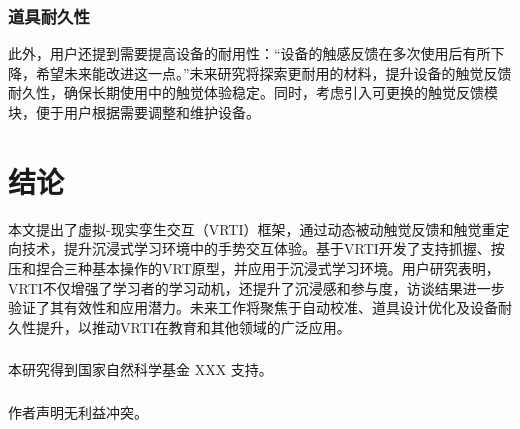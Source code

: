 \documentclass[runningheads]{llncs}
\begin{document}
\subsubsection{道具耐久性}
此外，用户还提到需要提高设备的耐用性：“设备的触感反馈在多次使用后有所下降，希望未来能改进这一点。”未来研究将探索更耐用的材料，提升设备的触觉反馈耐久性，确保长期使用中的触觉体验稳定。同时，考虑引入可更换的触觉反馈模块，便于用户根据需要调整和维护设备。

\section{结论}
本文提出了虚拟-现实孪生交互（VRTI）框架，通过动态被动触觉反馈和触觉重定向技术，提升沉浸式学习环境中的手势交互体验。基于VRTI开发了支持抓握、按压和捏合三种基本操作的VRT原型，并应用于沉浸式学习环境。用户研究表明，VRTI不仅增强了学习者的学习动机，还提升了沉浸感和参与度，访谈结果进一步验证了其有效性和应用潜力。未来工作将聚焦于自动校准、道具设计优化及设备耐久性提升，以推动VRTI在教育和其他领域的广泛应用。

\begin{credits}
\subsubsection{\ackname} 
本研究得到国家自然科学基金 XXX 
支持。

\subsubsection{\discintname}
作者声明无利益冲突。
\end{credits}


\end{document}

